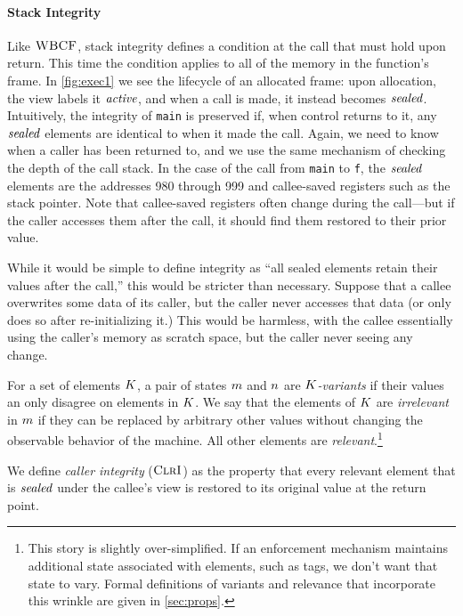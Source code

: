 \documentclass[10pt,conference]{ieeetran}%
\theoremstyle{definition}
\begin{document}

\paragraph*{Stack Integrity}

Like \(\textnormal{\sc WBCF}\), stack integrity defines a condition at the call that must hold upon
return. This time the condition applies to all of the memory in the function's
frame. In \cref{fig:exec1} we see the lifecycle of an allocated frame:
upon allocation, the view labels it \(\mathit{active}\), and when a call is made, it instead
becomes \(\mathit{sealed}\). Intuitively, the integrity of {\tt main}
is preserved if, when control returns to it, any \(\mathit{sealed}\) elements
are identical to when it made the call.
%
Again, we need to know when a caller has been returned to,
and we use the same mechanism of checking the depth of the call stack.
%
In the case of the call from {\tt main} to {\tt f}, the \(\mathit{sealed}\) elements are the
addresses 980 through 999 and callee-saved registers such as
the stack pointer. Note that callee-saved registers often change
during the call---but if the caller accesses them after the call, it should find them
restored to their prior value.

While it would be simple to define integrity as ``all sealed elements retain their
values after the call,'' this would be stricter than necessary. Suppose that
a callee overwrites some data of its caller, but the caller never accesses that data
(or only does so after re-initializing it.) This would be harmless, with the callee
essentially using the caller's memory as scratch space, but the caller never seeing any change.

For a set of elements \(K\),
a pair of states \(m\) and \(n\) are {\em \(K\)-variants} if
their values an only disagree on elements in \(K\).
We say that the elements of \(K\) are \emph{irrelevant}
in \(m\) if they can be replaced by arbitrary other values without changing the
observable behavior of the machine. All other elements are \emph{relevant}.\footnote{
This story is slightly over-simplified. If an enforcement mechanism maintains
additional state associated with elements, such as tags, we don't want that
state to vary. Formal definitions of variants and
relevance that incorporate this wrinkle are given in \cref{sec:props}.}

We define \emph{caller integrity} (\(\textnormal{\sc ClrI}\))  as the property that
every relevant element that is \(\mathit{sealed}\) under the callee's view is restored
to its original value at the return point.
\end{document}
